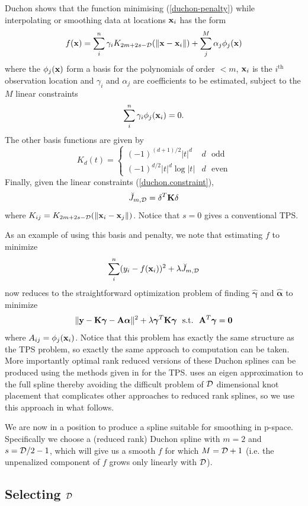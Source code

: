 \documentclass[smallextended]{svjour3}       %
\newcommand{\beq}{\begin{equation}}
\newcommand{\eeq}{\end{equation}}
\newcommand{\ts}{^T}
\begin{document}
Duchon shows that the function minimising (\ref{duchon-penalty}) while interpolating or smoothing data at locations ${\bf x}_i$ has the form 
$$
f({\bf x}) = \sum_i^n \gamma_i K_{2m+2s-{\cal D}}(\|{\bf x}-{\bf x}_i\|) + \sum_j^M \alpha_j \phi_j({\bf x})
$$
where the $\phi_j({\bf x})$ form a basis for the polynomials of order $<m$, ${\bf x}_i$ is the $i^\text{th}$ observation location and $\gamma_i$ and $\alpha_j$ are coefficients to be estimated, subject to the $M$ linear constraints
\beq
\sum_i^n \gamma_i \phi_j({\bf x}_i)=0.
\label{duchon.constraint}
\eeq
The other basis functions are given by
$$
K_d(t) = \left \{ \begin{array}{ll}
(-1)^{(d+1)/2}|t|^d & d \text{~~odd}\\
(-1)^{d/2}|t|^d\log |t| & d \text{~~even}
\end{array} \right .
$$
Finally, given the linear constraints (\ref{duchon.constraint}),
$$
\breve{J}_{m,{\cal D}} = {\bf \delta} \ts {\bf K} {\bf \delta}
$$
where $K_{ij} = K_{2m+2s-{\cal D}}(\|{\bf x}_i-{\bf x}_j\|)$. Notice that $s=0$ gives a conventional TPS.

As an example of using this basis and penalty, we note that estimating $f$ to minimize
$$
\sum_i^n (y_i - f({\bf x}_i))^2 + \lambda \breve{J}_{m,{\cal D}}
$$
now reduces to the straightforward optimization problem of finding $\hat {\bm \gamma} $ and $\hat {\bm \alpha}$ to minimize
$$
\|{\bf y} - {\bf K } {\bm \gamma} - {\bf A}{\bm \alpha}  \|^2 + \lambda {\bm \gamma}\ts {\bf K} {\bm \gamma} ~~\text{s.t.}~~{\bf A}\ts {\bm \gamma} = {\bf 0}
$$
where $A_{ij} = \phi_j({\bf x}_i)$. Notice that this problem has exactly the same structure as the TPS problem, so exactly the same approach to computation can be taken. More importantly optimal rank reduced versions of these Duchon splines can be produced using the methods given in \cite{Wood:2003tc} for the TPS. \cite{Wood:2003tc} uses an eigen approximation to the full spline thereby avoiding the difficult problem of $\cal D$ dimensional knot placement that complicates other approaches to reduced rank splines, so we use this approach in what follows.

We are now in a position to produce a spline suitable for smoothing in p-space. Specifically we choose a (reduced rank) Duchon spline with $m=2$ and $s = {\cal D}/2 - 1$, which will give us a smooth $f$ for which $M={\cal D}+1$ (i.e. the unpenalized component of $f$ grows only linearly with $\cal D$).

\subsection{Selecting $\cal D$}
\label{s:mdsdimselect}
\end{document}
